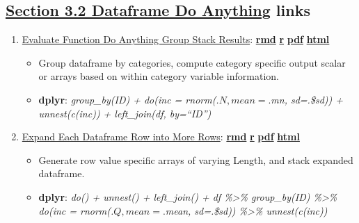 \documentclass[
]{book}
\providecommand{\tightlist}{%
  \setlength{\itemsep}{0pt}\setlength{\parskip}{0pt}}
\begin{document}
\hypertarget{section-3.2-dataframe-do-anythingdataframe-do-anything-links}{%
\subsection{\texorpdfstring{\protect\hyperlink{dataframe-do-anything}{Section 3.2 Dataframe Do Anything} links}{Section 3.2 Dataframe Do Anything links}}\label{section-3.2-dataframe-do-anythingdataframe-do-anything-links}}

\begin{enumerate}
\def\labelenumi{\arabic{enumi}.}
\tightlist
\item
  \href{https://fanwangecon.github.io/R4Econ/function/dof/htmlpdfr/fs_funceval_group.html}{Evaluate Function Do Anything Group Stack Results}: \href{https://github.com/FanWangEcon/R4Econ/blob/master/function/dof//fs_funceval_group.Rmd}{\textbf{rmd}} \textbar{} \href{https://github.com/FanWangEcon/R4Econ/blob/master/function/dof/htmlpdfr/fs_funceval_group.R}{\textbf{r}} \textbar{} \href{https://github.com/FanWangEcon/R4Econ/blob/master/function/dof/htmlpdfr/fs_funceval_group.pdf}{\textbf{pdf}} \textbar{} \href{https://fanwangecon.github.io/R4Econ/function/dof/htmlpdfr/fs_funceval_group.html}{\textbf{html}}

  \begin{itemize}
  \tightlist
  \item
    Group dataframe by categories, compute category specific output scalar or arrays based on within category variable information.
  \item
    \textbf{dplyr}: \emph{group\_by(ID) + do(inc = rnorm(.\(N, mean=.\)mn, sd=.\$sd)) + unnest(c(inc)) + left\_join(df, by=``ID'')}
  \end{itemize}
\item
  \href{https://fanwangecon.github.io/R4Econ/function/dof/htmlpdfr/fs_funceval_expand.html}{Expand Each Dataframe Row into More Rows}: \href{https://github.com/FanWangEcon/R4Econ/blob/master/function/dof//fs_funceval_expand.Rmd}{\textbf{rmd}} \textbar{} \href{https://github.com/FanWangEcon/R4Econ/blob/master/function/dof/htmlpdfr/fs_funceval_expand.R}{\textbf{r}} \textbar{} \href{https://github.com/FanWangEcon/R4Econ/blob/master/function/dof/htmlpdfr/fs_funceval_expand.pdf}{\textbf{pdf}} \textbar{} \href{https://fanwangecon.github.io/R4Econ/function/dof/htmlpdfr/fs_funceval_expand.html}{\textbf{html}}

  \begin{itemize}
  \tightlist
  \item
    Generate row value specific arrays of varying Length, and stack expanded dataframe.
  \item
    \textbf{dplyr}: \emph{do() + unnest() + left\_join() + df \%\textgreater\% group\_by(ID) \%\textgreater\% do(inc = rnorm(.\(Q, mean=.\)mean, sd=.\$sd)) \%\textgreater\% unnest(c(inc))}
  \end{itemize}
\end{enumerate}
\end{document}
